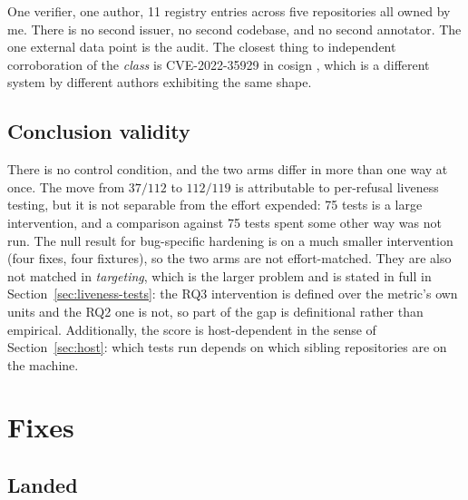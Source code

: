 \documentclass[11pt]{article}
\begin{document}
One verifier, one author, 11 registry entries across five repositories all owned by me. There
is no second issuer, no second codebase, and no second annotator. The one external data point
is the audit. The closest thing to independent corroboration of the \emph{class} is
CVE-2022-35929 in cosign \citep{cve2022sigstore}, which is a different system by different
authors exhibiting the same shape.

\subsection{Conclusion validity}

There is no control condition, and the two arms differ in more than one way at once. The move
from $37/112$ to $112/119$ is attributable to per-refusal liveness testing, but it is not
separable from the effort expended: 75 tests is a large intervention, and a comparison against
75 tests spent some other way was not run. The null result for bug-specific hardening is on a
much smaller intervention (four fixes, four fixtures), so the two arms are not effort-matched.
They are also not matched in \emph{targeting}, which is the larger problem and is stated in
full in Section~\ref{sec:liveness-tests}: the RQ3 intervention is defined over the metric's own
units and the RQ2 one is not, so part of the gap is definitional rather than empirical.
Additionally, the score is host-dependent in the sense of Section~\ref{sec:host}: which tests
run depends on which sibling repositories are on the machine.

\section{Fixes}
\label{sec:fixes}

\subsection{Landed}
\end{document}
